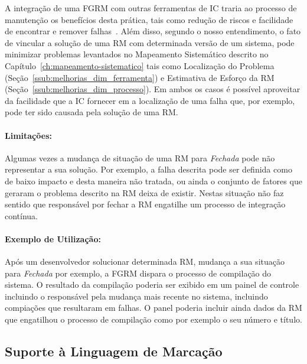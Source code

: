 A integração de uma FGRM com outras ferramentas de IC traria ao processo de
manutenção os benefícios desta prática, tais como redução de riscos e facilidade
de encontrar e remover falhas~\cite{fowler2006continuous}.  Além disso, segundo
o nosso entendimento, o fato de vincular a solução de uma RM com determinada
versão de um sistema, pode minimizar problemas levantados no Mapeamento
Sistemático descrito no Capítulo~\ref{ch:mapeamento-sistematico} tais como
Localização do Problema (Seção~\ref{ssub:melhorias_dim_ferramenta}) e Estimativa
de Esforço da RM (Seção~\ref{ssub:melhorias_dim_processo}). Em ambos os casos é
possível aproveitar da facilidade que a IC fornecer em a localização de uma
falha que, por exemplo, pode ter sido causada pela solução de uma RM\@.

\paragraph{Limitações:}
\label{par:limitacoes_s05}

Algumas vezes a mudança de situação de uma RM para \textit{Fechada} pode não
representar a sua solução. Por exemplo, a falha descrita pode ser definida como
de baixo impacto e desta maneira não tratada, ou ainda o conjunto de fatores que
geraram o problema descrito na RM deixa de existir. Nestas situação não faz
sentido que responsável por fechar a RM engatilhe um processo de integração
contínua.

\paragraph{Exemplo de Utilização:}
\label{par:exemplo_de_utilização_s05}

Após um desenvolvedor solucionar determinada RM, mudança a sua situação para
\textit{Fechada} por exemplo, a FGRM dispara o processo de compilação do
sistema. O resultado da compilação poderia ser exibido em um painel de controle
incluindo o responsável pela mudança mais recente no sistema, incluindo
compiações que resultaram em falhas. O panel poderia incluir ainda dados da RM
que engatilhou o processo de compilação como por exemplo o seu número e título.

\subsection{Suporte à Linguagem de Marcação}
\label{sub:suporte_linguagem_marcacao}


